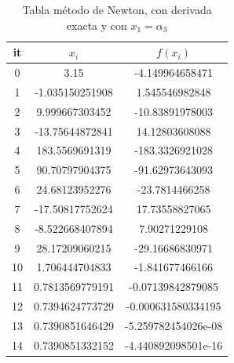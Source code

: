 \documentclass{article} %
\begin{document}
\begin{table}[H]
    \centering
    \begin{tabular}{|c|c|c|}
    \hline
it & $x_i$ & $f(x_i)$\\
\hline
0 & 3.15 & -4.149964658471\\
1 & -1.035150251908 & 1.545546982848\\
2 & 9.999667303452 & -10.83891978003\\
3 & -13.75644872841 & 14.12803608088\\
4 & 183.5569691319 & -183.3326921028\\
5 & 90.70797904375 & -91.62973643093\\
6 & 24.68123952276 & -23.7814466258\\
7 & -17.50817752624 & 17.73558827065\\
8 & -8.522668407894 & 7.90271229108\\
9 & 28.17209060215 & -29.16686830971\\
10 & 1.706444704833 & -1.841677466166\\
11 & 0.7813569779191 & -0.07139842879085\\
12 & 0.7394624773729 & -0.000631580334195\\
13 & 0.7390851646429 & -5.259782454026e-08\\
14 & 0.7390851332152 & -4.440892098501e-16\\
\hline
\end{tabular}
    \caption{Tabla método de Newton, con derivada exacta y con $x_1 = \alpha_3$}
    \label{tab:newtalp3ex}
\end{table}

\end{document}
